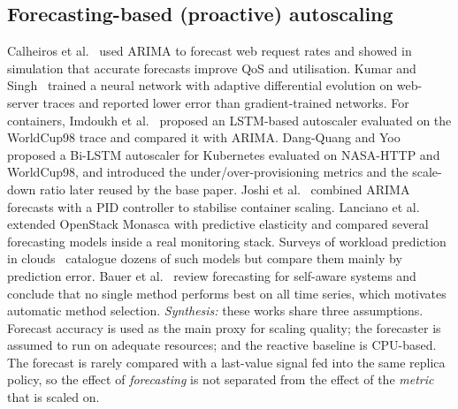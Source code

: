 \documentclass[conference,a4paper]{IEEEtran}
\begin{document}
\subsection{Forecasting-based (proactive) autoscaling}
Calheiros et al.~\cite{calheiros2015} used ARIMA to forecast web request rates and showed in simulation that
accurate forecasts improve QoS and utilisation. Kumar and Singh~\cite{kumar2018} trained a neural network with
adaptive differential evolution on web-server traces and reported lower error than gradient-trained networks.
For containers, Imdoukh et al.~\cite{imdoukh2020} proposed an LSTM-based autoscaler evaluated on the WorldCup98
trace and compared it with ARIMA. Dang-Quang and Yoo~\cite{dangquang2021} proposed a Bi-LSTM autoscaler for
Kubernetes evaluated on NASA-HTTP and WorldCup98, and introduced the under/over-provisioning metrics and the
scale-down ratio later reused by the base paper. Joshi et al.~\cite{joshi2024} combined ARIMA forecasts with a PID
controller to stabilise container scaling. Lanciano et al.~\cite{lanciano2024} extended OpenStack Monasca with
predictive elasticity and compared several forecasting models inside a real monitoring stack. Surveys of
workload prediction in clouds~\cite{amiri2017,masdari2020} catalogue dozens of such models but compare them mainly
by prediction error. Bauer et al.~\cite{bauer2020} review forecasting for self-aware systems and conclude that no
single method performs best on all time series, which motivates automatic method selection. \emph{Synthesis:}
these works share three assumptions. Forecast accuracy is used as the main proxy for scaling quality; the
forecaster is assumed to run on adequate resources; and the reactive baseline is CPU-based. The forecast is
rarely compared with a last-value signal fed into the same replica policy, so the effect of \emph{forecasting}
is not separated from the effect of the \emph{metric} that is scaled on.
\end{document}
